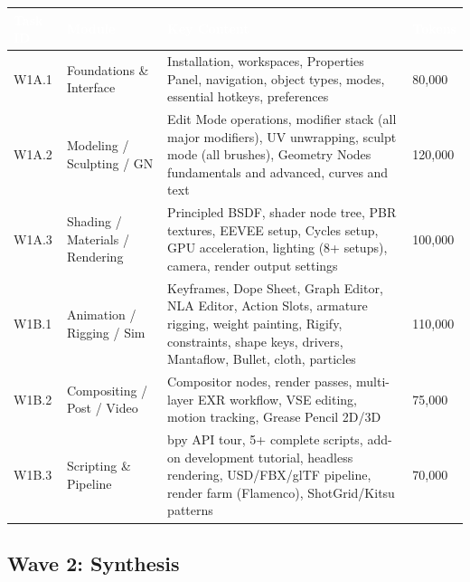 \documentclass[11pt,letterpaper]{article}
\newcommand{\tableheader}[1]{\textbf{\sffamily\textcolor{white}{#1}}}
\begin{document}
\begin{center}
\begin{tabularx}{\textwidth}{L{2.5cm}L{3cm}XC{2cm}}
\toprule
{}
\tableheader{Task ID} & \tableheader{Module} & \tableheader{Key Content} & \tableheader{Tokens} \\
\midrule
W1A.1 & Foundations \& Interface & Installation, workspaces, Properties Panel, navigation, object types, modes, essential hotkeys, preferences & 80,000 \\
W1A.2 & Modeling / Sculpting / GN & Edit Mode operations, modifier stack (all major modifiers), UV unwrapping, sculpt mode (all brushes), Geometry Nodes fundamentals and advanced, curves and text & 120,000 \\
W1A.3 & Shading / Materials / Rendering & Principled BSDF, shader node tree, PBR textures, EEVEE setup, Cycles setup, GPU acceleration, lighting (8+ setups), camera, render output settings & 100,000 \\
\midrule
W1B.1 & Animation / Rigging / Sim & Keyframes, Dope Sheet, Graph Editor, NLA Editor, Action Slots, armature rigging, weight painting, Rigify, constraints, shape keys, drivers, Mantaflow, Bullet, cloth, particles & 110,000 \\
W1B.2 & Compositing / Post / Video & Compositor nodes, render passes, multi-layer EXR workflow, VSE editing, motion tracking, Grease Pencil 2D/3D & 75,000 \\
W1B.3 & Scripting \& Pipeline & bpy API tour, 5+ complete scripts, add-on development tutorial, headless rendering, USD/FBX/glTF pipeline, render farm (Flamenco), ShotGrid/Kitsu patterns & 70,000 \\
\bottomrule
\end{tabularx}
\end{center}

\subsection{Wave 2: Synthesis}
\end{document}
